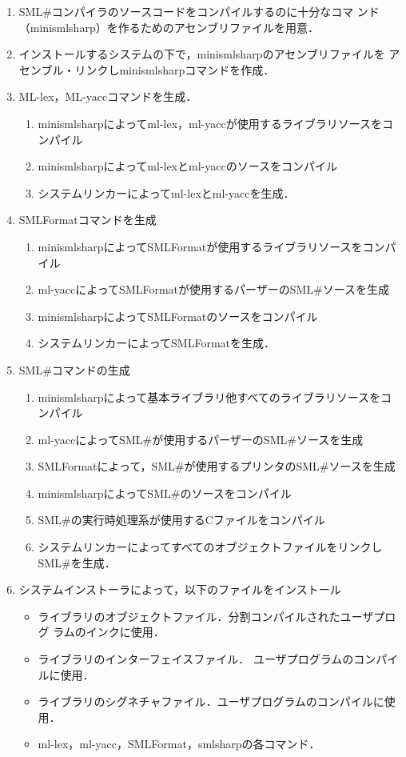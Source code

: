 \documentclass{jbook}
\newcommand{\smlsharp}{SML\#}
\begin{document}
\begin{enumerate}
\item \smlsharp{}コンパイラのソースコードをコンパイルするのに十分なコマ
ンド（minismlsharp）を作るためのアセンブリファイルを用意．

\item インストールするシステムの下で，minismlsharpのアセンブリファイルを
アセンブル・リンクしminismlsharpコマンドを作成．

\item ML-lex，ML-yaccコマンドを生成．
\begin{enumerate}
\item minismlsharpによってml-lex，ml-yaccが使用するライブラリソースをコンパイル
\item minismlsharpによってml-lexとml-yaccのソースをコンパイル
\item システムリンカーによってml-lexとml-yaccを生成．
\end{enumerate}

\item SMLFormatコマンドを生成
\begin{enumerate}
\item minismlsharpによってSMLFormatが使用するライブラリソースをコンパイル
\item ml-yaccによってSMLFormatが使用するパーザーの\smlsharp{}ソースを生成
\item minismlsharpによってSMLFormatのソースをコンパイル
\item システムリンカーによってSMLFormatを生成．
\end{enumerate}
\item \smlsharp{}コマンドの生成
\begin{enumerate}
\item minismlsharpによって基本ライブラリ他すべてのライブラリソースをコンパイル
\item ml-yaccによって\smlsharp{}が使用するパーザーの\smlsharp{}ソースを生成
\item SMLFormatによって，\smlsharp{}が使用するプリンタの\smlsharp{}ソースを生成
\item minismlsharpによって\smlsharp{}のソースをコンパイル
\item \smlsharp{}の実行時処理系が使用するCファイルをコンパイル
\item システムリンカーによってすべてのオブジェクトファイルをリンクし\smlsharp{}を生成．
\end{enumerate}
\item システムインストーラによって，以下のファイルをインストール
\begin{itemize}
\item ライブラリのオブジェクトファイル．分割コンパイルされたユーザプログ
ラムのインクに使用．
\item ライブラリのインターフェイスファイル．
ユーザプログラムのコンパイルに使用．
\item ライブラリのシグネチャファイル．ユーザプログラムのコンパイルに使用．
\item ml-lex，ml-yacc，SMLFormat，smlsharpの各コマンド．
\end{itemize}
\end{enumerate}
\end{document}
